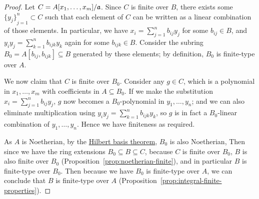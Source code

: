 \begin{proof}
    Let \(C = A[x_1,\hdots,x_m]/\mathfrak{a}\).
    Since \(C\) is finite over \(B\), there exists some \({\{y_j\}}_{j=1}^n \subset C\)
    such that each element of \(C\) can be written as a linear combination of those elements.
    In particular, we have \(x_i = \sum_{j=1}^n b_{ij} y_j\) for some \(b_{ij} \in B\),
    and \(y_i y_j = \sum_{k=1}^n b_{ijk} y_k\) again for some \(b_{ijk} \in B\).
    Consider the subring \(B_0 = A[b_{ij},b_{ijk}] \subseteq B\) generated by these elements;
    by definition, \(B_0\) is finite-type over \(A\).

    We now claim that \(C\) is finite over \(B_0\).
    Consider any \(g \in C\), which is a polynomial in \(x_1,\hdots,x_m\) with coefficients in \(A \subseteq B_0\).
    If we make the substitution \(x_i = \sum_{j=1}^n b_{ij} y_j\),
    \(g\) now becomes a \(B_0\)-polynomial in \(y_1,\hdots,y_n\);
    and we can also eliminate multiplication using \(y_i y_j = \sum_{k=1}^n b_{ijk} y_k\),
    so \(g\) is in fact a \(B_0\)-linear combination of \(y_1,\hdots,y_n\).
    Hence we have finiteness as required.

    As \(A\) is Noetherian, by the \hyperref[cor:hilbert-basis]{Hilbert basis theorem}, \(B_0\) is also Noetherian,
    Then since we have the ring extensions \(B_0 \subseteq B \subseteq C\),
    because \(C\) is finite over \(B_0\), \(B\) is also finite over \(B_0\) (Proposition~\ref{prop:noetherian-finite}),
    and in particular \(B\) is finite-type over \(B_0\).
    Then because we have \(B_0\) is finite-type over \(A\),
    we can conclude that \(B\) is finite-type over \(A\) (Proposition~\ref{prop:integral-finite-properties}).
\end{proof}

